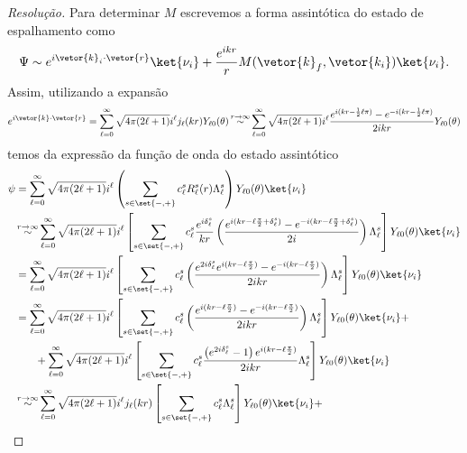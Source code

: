\begin{proof}[Resolução]
   Para determinar \(M\) escrevemos a forma assintótica do estado de espalhamento como
   \begin{equation*}
      \Psi \sim e^{i \vetor{k}_i \cdot \vetor{r}} \ket{\nu_i} + \frac{e^{ikr}}{r} M(\vetor{k}_f, \vetor{k_i}) \ket{\nu_i}.
   \end{equation*}
   Assim, utilizando a expansão
   \begin{equation*}
      e^{i \vetor{k} \cdot \vetor{r}} = \sum_{\ell = 0}^\infty \sqrt{4\pi(2\ell + 1)} i^\ell j_\ell(kr) Y_{\ell0}(\theta) \mathop{\sim}^{r\to\infty} \sum_{\ell = 0}^\infty \sqrt{4\pi(2\ell + 1)} i^\ell \frac{e^{i(kr - \frac12 \ell \pi)} - e^{-i(kr - \frac12 \ell \pi)}}{2ikr} Y_{\ell0}(\theta)
   \end{equation*}
   temos da expressão da função de onda do estado assintótico
   \begin{align*}
      \psi &= \sum_{\ell=0}^\infty \sqrt{4\pi(2\ell + 1)} i^\ell \left(\sum_{s \in \set{-,+}} c^s_{\ell} R_\ell^s(r) \Lambda_\ell^s \right) Y_{\ell 0}(\theta) \ket{\nu_i}\\
           &\mathop{\sim}^{r\to\infty} \sum_{\ell = 0}^\infty \sqrt{4\pi(2\ell + 1)} i^{\ell} \left[\sum_{s \in\set{-,+}}c_\ell^s \frac{e^{i \delta_\ell^s}}{kr}\left(\frac{e^{i(kr - \ell \frac\pi2 + \delta_\ell^s)} - e^{-i(kr - \ell \frac\pi2 + \delta_{\ell}^s)}}{2i}\right)\Lambda^s_\ell\right] Y_{\ell 0}(\theta) \ket{\nu_i}\\
           &= \sum_{\ell = 0}^\infty \sqrt{4\pi(2\ell + 1)} i^{\ell} \left[\sum_{s \in\set{-,+}}c_\ell^s \left(\frac{e^{2i \delta_{\ell}^s}e^{i(kr - \ell \frac\pi2)} - e^{-i(kr - \ell \frac\pi2)}}{2ikr}\right)\Lambda^s_\ell\right] Y_{\ell 0}(\theta) \ket{\nu_i}\\
           &= \sum_{\ell = 0}^\infty \sqrt{4\pi(2\ell + 1)} i^{\ell} \left[\sum_{s \in\set{-,+}}c_\ell^s \left(\frac{e^{i(kr - \ell \frac\pi2)} - e^{-i(kr - \ell \frac\pi2)}}{2ikr}\right)\Lambda^s_\ell\right] Y_{\ell 0}(\theta) \ket{\nu_i} + \\
           &{}\phantom{= + } + 
           \sum_{\ell = 0}^\infty \sqrt{4\pi(2\ell + 1)} i^{\ell} \left[\sum_{s \in\set{-,+}}c_\ell^s \frac{\left(e^{2i \delta_{\ell}^s} - 1\right)e^{i(kr - \ell \frac\pi2)}}{2ikr}\Lambda^s_\ell\right] Y_{\ell 0}(\theta) \ket{\nu_i}\\
           &\mathop{\sim}^{r\to\infty}\sum_{\ell = 0}^\infty \sqrt{4\pi(2\ell + 1)} i^{\ell} j_{\ell}(kr)\left[\sum_{s \in\set{-,+}}c_\ell^s \Lambda^s_\ell\right] Y_{\ell 0}(\theta) \ket{\nu_i} +\\

\end{align*}
\end{proof}

